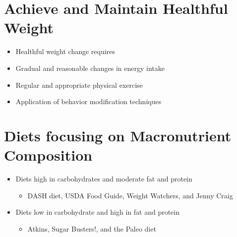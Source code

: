 \documentclass[title={Chapter 10: Achieving and Maintaining a Healthful Body Weight}]{fdsn201notes}
\begin{document}
\section{Achieve and Maintain Healthful Weight}\label{sec:achieve-and-maintain-healthful-weight}
\begin{itemize}
	\item Healthful weight change requires
	\item Gradual and reasonable changes in energy intake
	\item Regular and appropriate physical exercise
	\item Application of behavior modification techniques
\end{itemize}

\section{Diets focusing on Macronutrient Composition}\label{sec:diets-focusing-on-macronutrient-composition}
\begin{itemize}
	\item Diets high in carbohydrates and moderate fat and protein
	\begin{itemize}
		\item DASH diet, USDA Food Guide, Weight Watchers, and Jenny Craig
	\end{itemize}
	\item Diets low in carbohydrate and high in fat and protein
	\begin{itemize}
		\item Atkins, Sugar Busters!, and the Paleo diet
	\end{itemize}
\end{itemize}
\end{document}
